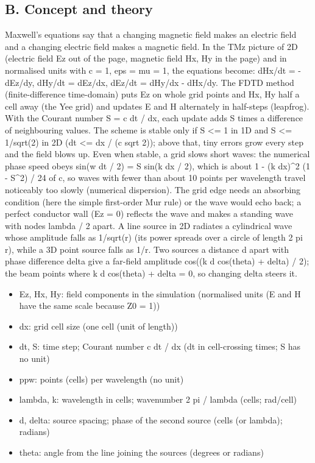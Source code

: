 \documentclass[11pt,a4paper]{article}
\begin{document}
\subsection*{B. Concept and theory}
Maxwell's equations say that a changing magnetic field makes an electric field and a changing electric field makes a magnetic field. In the TMz picture of 2D (electric field Ez out of the page, magnetic field Hx, Hy in the page) and in normalised units with c = 1, eps = mu = 1, the equations become: dHx/dt = -dEz/dy, dHy/dt = dEz/dx, dEz/dt = dHy/dx - dHx/dy. The FDTD method (finite-difference time-domain) puts Ez on whole grid points and Hx, Hy half a cell away (the Yee grid) and updates E and H alternately in half-steps (leapfrog). With the Courant number S = c dt / dx, each update adds S times a difference of neighbouring values. The scheme is stable only if S \textless{}= 1 in 1D and S \textless{}= 1/sqrt(2) in 2D (dt \textless{}= dx / (c sqrt 2)); above that, tiny errors grow every step and the field blows up. Even when stable, a grid slows short waves: the numerical phase speed obeys sin(w dt / 2) = S sin(k dx / 2), which is about 1 - (k dx)\textasciicircum{}2 (1 - S\textasciicircum{}2) / 24 of c, so waves with fewer than about 10 points per wavelength travel noticeably too slowly (numerical dispersion). The grid edge needs an absorbing condition (here the simple first-order Mur rule) or the wave would echo back; a perfect conductor wall (Ez = 0) reflects the wave and makes a standing wave with nodes lambda / 2 apart. A line source in 2D radiates a cylindrical wave whose amplitude falls as 1/sqrt(r) (its power spreads over a circle of length 2 pi r), while a 3D point source falls as 1/r. Two sources a distance d apart with phase difference delta give a far-field amplitude \textbar{}cos((k d cos(theta) + delta) / 2)\textbar{}; the beam points where k d cos(theta) + delta = 0, so changing delta steers it.

\begin{itemize}[nosep]
\item Ez, Hx, Hy: field components in the simulation (normalised units (E and H have the same scale because Z0 = 1))
\item dx: grid cell size (one cell (unit of length))
\item dt, S: time step; Courant number c dt / dx (dt in cell-crossing times; S has no unit)
\item ppw: points (cells) per wavelength (no unit)
\item lambda, k: wavelength in cells; wavenumber 2 pi / lambda (cells; rad/cell)
\item d, delta: source spacing; phase of the second source (cells (or lambda); radians)
\item theta: angle from the line joining the sources (degrees or radians)
\end{itemize}
\end{document}
